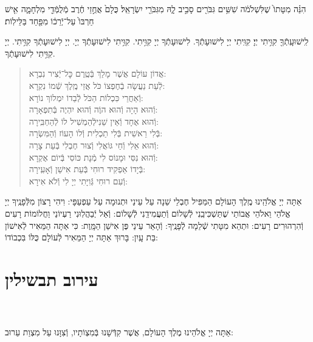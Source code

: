 \documentclass[twoside, openany, parskip=half, 11pt]{book}
\begin{document}
הִנֵּ֗ה מִטָּתוֹ֙ שֶׁלִּשְׁלֹמֹ֔ה שִׁשִּׁ֥ים גִּבֹּרִ֖ים סָבִ֣יב לָ֑הּ מִגִּבֹּרֵ֖י יִשְׂרָאֵֽל׃ כֻּלָם֙ אֲחֻ֣זֵי חֶ֔רֶב מְֿלֻמְּֿדֵ֖י מִלְחָמָ֑ה אִ֤ישׁ חַרְבּוֹ֙ עַל־יְֿרֵכ֔וֹ מִפַּ֖חַד בַּלֵּילֽוֹת׃


לִֽישׁוּעָֽתְֿךָ֖ קִוִּ֥יתִי יְיָ׃ קִוִּֽיתִי יְיָ לִישׁוּעָתְֿךָ. לִישׁוּעָתְֿךָ יְיָ קִוִּ֥יתִי. קִוִּ֥יתִי לִישׁוּעָתְֿךָ יְיָ. יְיָ לִישׁוּעָתְֿךָ קִוִּ֥יתִי. יְיָ קִוִּ֥יתִי לִישׁוּעָתְֿךָ.

\vspace{-\baselineskip}
\begin{quote}
	
	אֲדוֹן עוֹלָם אֲשֶׁר מָלַךְ \hfill בְּֿטֶֽרֶם כׇּל־יְֿצִיר נִבְרָא:\\
	לְֿעֵת נַעֲשָׂה בְֿחֶפְצוֹ כֹּל \hfill אֲזַי מֶֽלֶךְ שְֿׁמוֹ נִקְרָא:\\
	וְֿאַחֲרֵי כִּכְלוֹת הַכֹּל \hfill לְֿבַדוֹ יִמְלוֹךְ נוֹרָא:\\
	וְֿהוּא הָיָה וְֿהוּא הוֶֹה \hfill וְֿהוּא יִהְיֶה בְּֿתִפְאָרָה:\\
	וְֿהוּא אֶחָד וְֿאֵין שֵׁנִי\hfill לְֿהַמְשִׁיל לוֹ לְֿהַחְבִּֽירָה:\\
	בְּֿלִי רֵאשִׁית בְּֿלִי תַכְלִית \hfill וְֿלוֹ הָעוֹז וְֿהַמִּשְׂרָה:\\
	וְֿהוּא אֵלִי וְֿחַי גּוֹאֲלִי \hfill וְֿצוּר חֶבְלִי בְּֿעֵת צָרָה:\\
	וְֿהוּא נִסִּי וּמָנוֹס לִי \hfill מְֿנָת כּוֹסִי בְּֿיוֹם אֶקְרָא:\\
	בְּֿיָדוֹ אַפְקִיד רוּחִי \hfill בְּֿעֵת אִישַׁן וְֿאָעִֽירָה:\\
	וְֿעִם רוּחִי גְּֿוִיָּתִי \hfill יְיָ לִי וְֿלֹא אִירָא:
	
\end{quote}


אַתָּה יְיָ אֱלֹהֵֽינוּ מֶֽלֶךְ הָעוֹלָם הַמַּפִּיל חֶבְלֵי שֵׁנָה עַל עֵינַי וּתְנוּמָה עַל עַפְעַפָּי: וִיהִי רָצוֹן מִלְּֿפָנֶֽיךָ יְיָ אֱלֹהַי וֵאלֹהֵי אֲבוֹתַי שֶׁתַּשְׁכִּיבֵֽנִי לְֿשָׁלוֹם וְֿתַעֲמִידֵֽנִי לְֿשָׁלוֹם: וְֿאַל יְֿבַהֲלֽוּנִי רַעְיוֹנַי וַחֲלוֹמוֹת רָעִים וְֿהִרְהוּרִים רָעִים: וּתְהֵא מִטָּתִי שְֿׁלֵמָה לְֿפָנֶֽיךָ: וְֿהָאֵר עֵינַי פֶּן אִישַׁן הַמָּֽוֶת: כִּי אַתָּה הַמֵּאִיר לְֿאִישׁוֹן בַּת עָֽיִן: בָּרוּךְ אַתָּה יְיָ הַמֵּאִיר לְֿעוֹלָם כֻּלּוֹ בִּכְבוֹדוֹ:


\chapter[עירוב תבשילין]{ עירוב תבשילין }

\\
\\
 אַתָּה יְיָ אֱלֹהֵינוּ מֶלֶךְ הָעוֹלָם, אֲשֶׁר קִדְּֿשָׁנוּ בְּֿמִצְוֹתָיו, וְֿצִוָּנוּ עַל מִצְוַת עֵרוּב:
\end{document}
